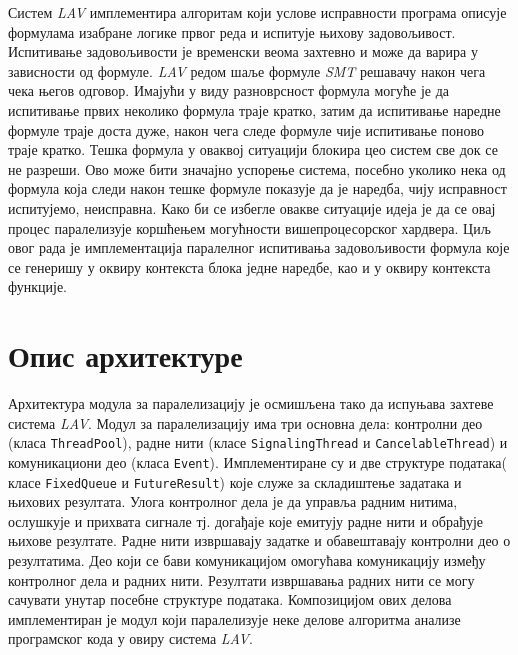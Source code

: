 \documentclass[12pt,oneside]{memoir}
\begin{document}
Систем \textit{LAV} имплементира алгоритам који услове исправности програма описује формулама изабране логике првог реда и испитује њихову задовољивост.  Испитивање задовољивости је  временски веома захтевно и може да варира у зависности од формуле. \textit{LAV} редом шаље формуле \textit{SMT} решавачу након чега чека његов одговор. Имајући у виду разноврсност формула могуће је да испитивање првих неколико формула траје кратко, затим да испитивање наредне формуле траје доста дуже, након чега следе формуле чије испитивање поново траје кратко. Тешка формула у оваквој ситуацији блокира цео систем све док се не разреши. Ово може бити значајно успорење система, посебно уколико нека од формула која следи након тешке формуле показује да је наредба, чију исправност испитујемо, неисправна. 	
Како би се избегле овакве ситуације идеја је да се овај процес паралелизује коршћењем могућности вишепроцесорског хардвера. Циљ овог рада је имплементација паралелног испитивања задовољивости формула које се генеришу у оквиру контекста блока једне наредбе, као и у оквиру контекста функције. 

\section{Опис архитектуре}

Архитектура модула за паралелизацију је осмишљена тако да испуњава захтеве система \textit{LAV}. Модул за паралелизацију има три основна дела: контролни део (класа \texttt{ThreadPool}), радне нити (класе \texttt{SignalingThread} и \texttt{CancelableThread}) и комуникациони део (класа \texttt{Event}). Имплементиране су и две структуре података( класе \texttt{FixedQueue} и \texttt{FutureResult}) које служе за складиштење задатака и њихових резултата. Улога контролног дела је да управља радним нитима, ослушкује и прихвата сигнале тј. догађаје које емитују радне нити и обрађује њихове резултате. Радне нити извршавају задатке и обавештавају контролни део о резултатима. Део који се бави комуникацијом омогућава комуникацију између контролног дела и радних нити. Резултати извршавања радних нити се могу сачувати унутар посебне структуре података. Композицијом ових делова имплементиран је модул који паралелизује неке делове алгоритма анализе програмског кода у овиру система \textit{LAV}. 
\end{document}
